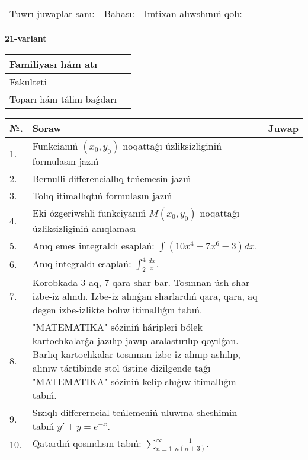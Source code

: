 \documentclass{article}
\begin{document}
\vspace{1cm}

\begin{tabular}{ c c c }
Tuwrı juwaplar sanı: \underline{\hspace{2cm}} & Bahası: \underline{\hspace{2cm}} & Imtixan alıwshınıń qolı: \underline{\hspace{2cm}} \\
\end{tabular}

\newpage

\begin{center}\textbf{21-variant}\end{center}

\bgroup
\def\arraystretch{1.5}
\begin{tabular}{ |m{6cm}|m{10cm}| }
  \hline
  Familiyası hám atı & \\
  \hline
  Fakulteti &\\
  \hline
  Toparı hám tálim baǵdarı & \\
  \hline
\end{tabular}
\egroup

\vspace{0.5cm}

\bgroup
\def\arraystretch{2}
\begin{tabular}{ |l|m{8cm}|m{7cm}| }
  \hline
  №. & Soraw & Juwap \\
  \hline
  1. & Funkcianıń $(x_{0}, y_{0})$ noqattaǵı úzliksizliginiń formulasın jazıń &  \\
  \hline
  2. & Bernulli differenciallıq teńemesin jazıń &  \\
  \hline
  3. & Tolıq itimallıqtıń formulasın jazıń &  \\
  \hline
  4. & Eki ózgeriwshli funkciyanıń $M(x_{0} , y_{0})$ noqattaǵı úzliksizliginiń anıqlaması &  \\
  \hline
  5. & Anıq emes integraldı esaplań: $\displaystyle\int \left( 10x^{4} + 7x^{6} - 3 \right)dx$. &  \\
  \hline
  6. & Anıq integraldı esaplań: $\displaystyle\int_{2}^{4}\frac{dx}{x}$. &  \\
  \hline
  7. & Korobkada 3 aq, 7 qara shar bar. Tosınnan úsh shar izbe-iz alındı. Izbe-iz alınǵan sharlardıń qara, qara, aq degen izbe-izlikte bolıw itimallıǵın tabıń. &  \\
  \hline
  8. & "MATEMATIKA" sóziniń háripleri bólek kartochkalarǵa jazılıp jawıp aralastırılıp qoyılǵan. Barlıq kartochkalar tosınnan izbe-iz alınıp ashılıp, alınıw tártibinde stol ústine dizilgende taǵı "MATEMATIKA" sóziniń kelip shıǵıw itimallıǵın tabıń. &  \\
  \hline
  9. & Sızıqlı differerncial teńlemeniń uluwma sheshimin tabıń $y' + y =e^{-x}$. &  \\
  \hline
  10. & Qatardıń qosındısın tabıń: $\displaystyle\sum_{n = 1}^{\infty}\frac{1}{n(n + 3)}$. &  \\
  \hline
\end{tabular}
\egroup
\end{document}
